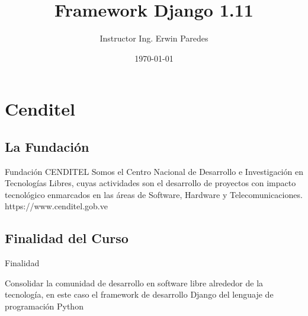 \documentclass[xcolor=dvipsnames]{beamer}
\title []{Framework Django 1.11}
\author{Instructor Ing. Erwin Paredes}
\institute{CENDITEL}
\date{\today}
\begin{document}
\section{Cenditel}
\begin{frame}
\maketitle
\end{frame}

\subsection{La Fundación}
\begin{frame}
\begin{block}{Fundación CENDITEL}
\indent   
Somos el Centro Nacional de Desarrollo e Investigación en Tecnologías Libres, cuyas actividades son el desarrollo de proyectos con impacto tecnológico enmarcados en las áreas de Software, Hardware y Telecomunicaciones. 
https://www.cenditel.gob.ve

\end{block}
\end{frame}

\subsection{Finalidad del Curso}
\begin{frame}
\begin{block}{Finalidad}
     
Consolidar la comunidad de desarrollo en software libre alrededor de la tecnología, en este caso el framework de desarrollo Django del lenguaje de programación Python
\end{block}
\end{frame}
\end{document}
